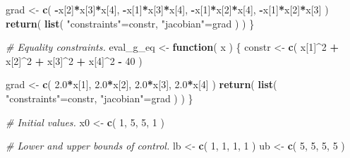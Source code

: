 \documentclass[onecolumn]{article}
\newenvironment{Shaded}{\begin{snugshade}}{\end{snugshade}}
\newcommand{\KeywordTok}[1]{\textcolor[rgb]{0.13,0.29,0.53}{\textbf{#1}}}
\newcommand{\DecValTok}[1]{\textcolor[rgb]{0.00,0.00,0.81}{#1}}
\newcommand{\FloatTok}[1]{\textcolor[rgb]{0.00,0.00,0.81}{#1}}
\newcommand{\StringTok}[1]{\textcolor[rgb]{0.31,0.60,0.02}{#1}}
\newcommand{\CommentTok}[1]{\textcolor[rgb]{0.56,0.35,0.01}{\textit{#1}}}
\newcommand{\ControlFlowTok}[1]{\textcolor[rgb]{0.13,0.29,0.53}{\textbf{#1}}}
\newcommand{\OperatorTok}[1]{\textcolor[rgb]{0.81,0.36,0.00}{\textbf{#1}}}
\newcommand{\NormalTok}[1]{#1}
\begin{document}
\begin{Shaded}
\begin{Highlighting}[]
\NormalTok{        grad   <-}\StringTok{ }\KeywordTok{c}\NormalTok{( }\OperatorTok{-}\NormalTok{x[}\DecValTok{2}\NormalTok{]}\OperatorTok{*}\NormalTok{x[}\DecValTok{3}\NormalTok{]}\OperatorTok{*}\NormalTok{x[}\DecValTok{4}\NormalTok{],}
                     \OperatorTok{-}\NormalTok{x[}\DecValTok{1}\NormalTok{]}\OperatorTok{*}\NormalTok{x[}\DecValTok{3}\NormalTok{]}\OperatorTok{*}\NormalTok{x[}\DecValTok{4}\NormalTok{],}
                     \OperatorTok{-}\NormalTok{x[}\DecValTok{1}\NormalTok{]}\OperatorTok{*}\NormalTok{x[}\DecValTok{2}\NormalTok{]}\OperatorTok{*}\NormalTok{x[}\DecValTok{4}\NormalTok{],}
                     \OperatorTok{-}\NormalTok{x[}\DecValTok{1}\NormalTok{]}\OperatorTok{*}\NormalTok{x[}\DecValTok{2}\NormalTok{]}\OperatorTok{*}\NormalTok{x[}\DecValTok{3}\NormalTok{] )}
        \KeywordTok{return}\NormalTok{( }\KeywordTok{list}\NormalTok{( }\StringTok{"constraints"}\NormalTok{=constr, }\StringTok{"jacobian"}\NormalTok{=grad ) )}
\NormalTok{    \}}

    \CommentTok{# Equality constraints.}
\NormalTok{    eval_g_eq <-}\StringTok{ }\ControlFlowTok{function}\NormalTok{( x ) \{}
\NormalTok{        constr <-}\StringTok{ }\KeywordTok{c}\NormalTok{( x[}\DecValTok{1}\NormalTok{]}\OperatorTok{^}\DecValTok{2} \OperatorTok{+}\StringTok{ }\NormalTok{x[}\DecValTok{2}\NormalTok{]}\OperatorTok{^}\DecValTok{2} \OperatorTok{+}\StringTok{ }\NormalTok{x[}\DecValTok{3}\NormalTok{]}\OperatorTok{^}\DecValTok{2} \OperatorTok{+}\StringTok{ }\NormalTok{x[}\DecValTok{4}\NormalTok{]}\OperatorTok{^}\DecValTok{2} \OperatorTok{-}\StringTok{ }\DecValTok{40}\NormalTok{ )}

\NormalTok{        grad   <-}\StringTok{ }\KeywordTok{c}\NormalTok{(  }\FloatTok{2.0}\OperatorTok{*}\NormalTok{x[}\DecValTok{1}\NormalTok{],}
                      \FloatTok{2.0}\OperatorTok{*}\NormalTok{x[}\DecValTok{2}\NormalTok{],}
                      \FloatTok{2.0}\OperatorTok{*}\NormalTok{x[}\DecValTok{3}\NormalTok{],}
                      \FloatTok{2.0}\OperatorTok{*}\NormalTok{x[}\DecValTok{4}\NormalTok{] )}
        \KeywordTok{return}\NormalTok{( }\KeywordTok{list}\NormalTok{( }\StringTok{"constraints"}\NormalTok{=constr, }\StringTok{"jacobian"}\NormalTok{=grad ) )}
\NormalTok{    \}}

    \CommentTok{# Initial values.}
\NormalTok{    x0 <-}\StringTok{ }\KeywordTok{c}\NormalTok{( }\DecValTok{1}\NormalTok{, }\DecValTok{5}\NormalTok{, }\DecValTok{5}\NormalTok{, }\DecValTok{1}\NormalTok{ )}

    \CommentTok{# Lower and upper bounds of control.}
\NormalTok{    lb <-}\StringTok{ }\KeywordTok{c}\NormalTok{( }\DecValTok{1}\NormalTok{, }\DecValTok{1}\NormalTok{, }\DecValTok{1}\NormalTok{, }\DecValTok{1}\NormalTok{ )}
\NormalTok{    ub <-}\StringTok{ }\KeywordTok{c}\NormalTok{( }\DecValTok{5}\NormalTok{, }\DecValTok{5}\NormalTok{, }\DecValTok{5}\NormalTok{, }\DecValTok{5}\NormalTok{ )}


\end{Highlighting}
\end{Shaded}
\end{document}

